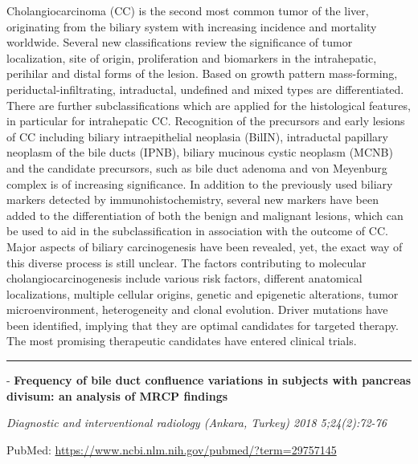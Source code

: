 \documentclass[]{article}
\begin{document}
Cholangiocarcinoma (CC) is the second most common tumor of the liver,
originating from the biliary system with increasing incidence and
mortality worldwide. Several new classifications review the significance
of tumor localization, site of origin, proliferation and biomarkers in
the intrahepatic, perihilar and distal forms of the lesion. Based on
growth pattern mass-forming, periductal-infiltrating, intraductal,
undefined and mixed types are differentiated. There are further
subclassifications which are applied for the histological features, in
particular for intrahepatic CC. Recognition of the precursors and early
lesions of CC including biliary intraepithelial neoplasia (BilIN),
intraductal papillary neoplasm of the bile ducts (IPNB), biliary
mucinous cystic neoplasm (MCNB) and the candidate precursors, such as
bile duct adenoma and von Meyenburg complex is of increasing
significance. In addition to the previously used biliary markers
detected by immunohistochemistry, several new markers have been added to
the differentiation of both the benign and malignant lesions, which can
be used to aid in the subclassification in association with the outcome
of CC. Major aspects of biliary carcinogenesis have been revealed, yet,
the exact way of this diverse process is still unclear. The factors
contributing to molecular cholangiocarcinogenesis include various risk
factors, different anatomical localizations, multiple cellular origins,
genetic and epigenetic alterations, tumor microenvironment,
heterogeneity and clonal evolution. Driver mutations have been
identified, implying that they are optimal candidates for targeted
therapy. The most promising therapeutic candidates have entered clinical
trials.

{}

{}

\begin{center}\rule{0.5\linewidth}{\linethickness}\end{center}

 - \textbf{Frequency of bile duct confluence variations in subjects with
pancreas divisum: an analysis of MRCP findings}

\emph{Diagnostic and interventional radiology (Ankara, Turkey) 2018
5;24(2):72-76}

PubMed: \url{https://www.ncbi.nlm.nih.gov/pubmed/?term=29757145}
\end{document}

